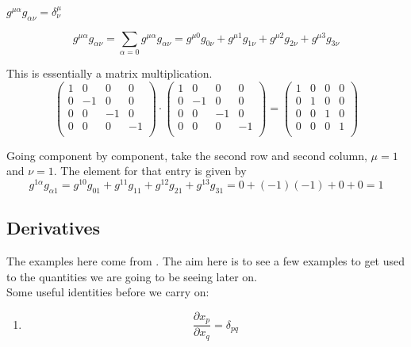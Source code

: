 $g^{\mu\alpha} g_{\alpha\nu} = \delta^{\mu}_{\nu}$

$$
g^{\mu\alpha} g_{\alpha\nu} = \sum_{\alpha = 0} g^{\mu\alpha} g_{\alpha\nu} =
g^{\mu 0} g_{0 \nu} + g^{\mu 1} g_{1\nu} + g^{\mu 2} g_{2\nu} + g^{\mu 3} g_{3\nu}
$$

This is essentially a matrix multiplication.
$$
\begin{pmatrix}
    1 & 0  & 0  & 0  \\
    0 & -1 & 0  & 0  \\
    0 & 0  & -1 & 0  \\
    0 & 0  & 0  & -1 \\
\end{pmatrix}
\cdot
\begin{pmatrix}
    1 & 0  & 0  & 0  \\
    0 & -1 & 0  & 0  \\
    0 & 0  & -1 & 0  \\
    0 & 0  & 0  & -1 \\
\end{pmatrix}
=
\begin{pmatrix}
    1 & 0 & 0 & 0 \\
    0 & 1 & 0 & 0 \\
    0 & 0 & 1 & 0 \\
    0 & 0 & 0 & 1 \\
\end{pmatrix}
$$

Going component by component, take the second row and second column, $\mu=1$ and $\nu=1$.
The element for that entry is given by
$$
g^{1\alpha}g_{\alpha 1} =
g^{1 0} g_{0 1} + g^{1 1} g_{1 1} + g^{1 2} g_{2 1} + g^{1 3} g_{3 1}
= 0 + (-1)(-1) + 0 + 0 = 1
$$


\subsection{Derivatives}

The examples here come from \cite{tensor-calc}.
The aim here is to see a few examples to get used to the quantities we are going to be seeing later on.
\\

Some useful identities before we carry on:
\begin{enumerate}
    \item
    $$
    \frac{\partial x_p}{\partial x_q} = \delta_{pq}
    $$
\end{enumerate}



